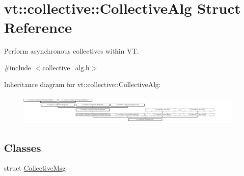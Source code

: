\hypertarget{structvt_1_1collective_1_1_collective_alg}{}\section{vt\+:\+:collective\+:\+:Collective\+Alg Struct Reference}
\label{structvt_1_1collective_1_1_collective_alg}


Perform asynchronous collectives within VT.  




{\ttfamily \#include $<$collective\+\_\+alg.\+h$>$}

Inheritance diagram for vt\+:\+:collective\+:\+:Collective\+Alg\+:\begin{figure}[H]
\begin{center}
\leavevmode
\includegraphics[height=1.495727cm]{structvt_1_1collective_1_1_collective_alg}
\end{center}
\end{figure}
\subsection*{Classes}
\begin{DoxyCompactItemize}
\item 
struct \hyperlink{structvt_1_1collective_1_1_collective_alg_1_1_collective_msg}{Collective\+Msg}
\end{DoxyCompactItemize}
